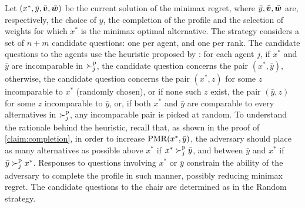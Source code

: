 \documentclass{article}
\begin{document}
Let $(x^{*},\bar{y}, \bar{\bm{v}}, \bar{\bm{w}})$ be the current solution of the minimax regret, where $\bar{y}, \bar{\bm{v}}, \bar{\bm{w}}$ are, respectively, the choice of $y$, the completion of the profile and the selection of weights for which $x^{*}$ is the minimax optimal alternative. 
The  strategy considers a set of $n + m$ candidate questions: one per agent, and one per rank.
The candidate questions to the agents use the heuristic proposed by \citet{Lu2011}: for each agent $j$, if $x^*$ and $\bar{y}$ are incomparable in $\succ^\text{p}_j$, the candidate question concerns the pair $(x^*, \bar{y})$, otherwise, the candidate question concerns the pair $(x^*, z)$ for some $z$ incomparable to $x^*$ (randomly chosen), or if none such $z$ exist, the pair $(\bar{y}, z)$ for some $z$ incomparable to $\bar{y}$, or, if both $x^*$ and $\bar{y}$ are comparable to every alternatives in $\succ^\text{p}_j$, any incomparable pair is picked at random. 
To understand the rationale behind the heuristic, 
recall that, as shown in the proof of \cref{claim:completion}, in order to increase $\operatorname{PMR}(x^{*},\bar{y})$, the adversary should place as many alternatives as possible above $x^{*}$ if $x^* \succ^\text{p}_j \bar{y}$, and between $\bar{y}$ and $x^{*}$ if $\bar{y} \succ^\text{p}_j x^*$.  
Responses to questions involving $x^*$ or $\bar{y}$ constrain the ability of the adversary to complete the profile in such manner, possibly reducing minimax regret.
The candidate questions to the chair are determined as in the Random strategy.
\end{document}
